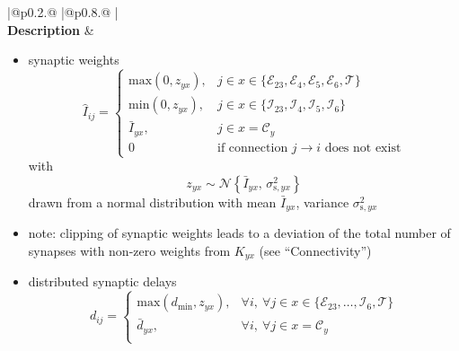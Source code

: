 \documentclass[10pt,a4paper,twoside,american]{article}
\theoremstyle{definitionstyle}
\begin{document}
\clearpage
\begin{table}
\begin{tabular}{
  |@{\hspace*{\marg}}p{}@{\hspace*{\marg}}
  |@{\hspace*{\marg}}p{}@{\hspace*{\marg}}
  |}
  \hline 
  \\
  \hline 
  \textbf{Description} &
  \begin{itemize}
  \item synaptic weights
  \begin{equation}
	  \hat{I}_{ij} = \begin{cases} 
      \text{max}(0,z_{yx}), & j \in x\in\{\mathcal{E}_{23},\mathcal{E}_{4},\mathcal{E}_{5},\mathcal{E}_{6},\mathcal{T}\} \\
      \text{min}(0,z_{yx}), & j \in x\in\{\mathcal{I}_{23},\mathcal{I}_{4},\mathcal{I}_{5},\mathcal{I}_{6}\} \\
      \bar{I}_{yx}, & j \in x=\mathcal{C}_y \\
      0             & \text{if connection $j\to{}i$ does not exist}
      \end{cases}
  \end{equation}
  with
  \begin{equation}
      z_{yx} \sim\mathcal{N}\left\{\bar{I}_{yx},\,\sigma_{\text{s},yx}^2\right\}
  \end{equation}
  drawn from a normal distribution with mean $\bar{I}_{yx}$, variance $\sigma_{\text{s},yx}^2$
  \item[] note: clipping of synaptic weights leads to a deviation of the total number of synapses with non-zero weights from $K_{yx}$ (see ``Connectivity'')
  \item distributed synaptic delays
  \begin{equation}
      d_{ij} = \begin{cases} 
	      \text{max}(d_\text{min},z_{yx}), & \forall i,\ \forall j \in x\in\{\mathcal{E}_{23},\ldots,\mathcal{I}_{6},\mathcal{T}\} \\
      	\bar{d}_{yx}, & \forall i,\ \forall j \in x=\mathcal{C}_y \\
      \end{cases}

\end{equation}
\end{itemize}
\end{tabular}
\end{table}
\end{document}
